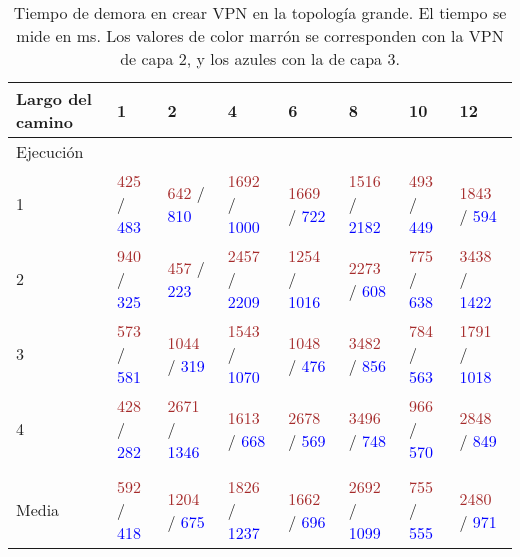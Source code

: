 \begin{table}[ht]
	\scriptsize
	\caption{Tiempo de demora en crear VPN en la topología grande. El tiempo se mide en ms. Los valores de color marrón se corresponden con la VPN de capa 2, y los azules con la de capa 3.}
	\centering 
	\begin{tabular}{p{2.2cm} p{1.4cm} p{1.4cm} p{1.4cm} p{1.4cm} p{1.4cm} p{1.4cm} p{1.4cm}}
		\hline
		Largo del camino & 1 & 2 & 4 & 6 & 8 & 10 & 12 \\ [0.5ex]
		\hline
		Ejecución & & & & & & & \\
		1 & \textcolor{brown}{425} / \textcolor{blue}{483} & \textcolor{brown}{642} / \textcolor{blue}{810} & \textcolor{brown}{1692} / \textcolor{blue}{1000} & \textcolor{brown}{1669} / \textcolor{blue}{722} & \textcolor{brown}{1516} / \textcolor{blue}{2182} & \textcolor{brown}{493} / \textcolor{blue}{449} & \textcolor{brown}{1843} / \textcolor{blue}{594} \\
		2 & \textcolor{brown}{940} / \textcolor{blue}{325} & \textcolor{brown}{457} / \textcolor{blue}{223} & \textcolor{brown}{2457} / \textcolor{blue}{2209} & \textcolor{brown}{1254} / \textcolor{blue}{1016}  & \textcolor{brown}{2273} / \textcolor{blue}{608} & \textcolor{brown}{775} / \textcolor{blue}{638} & \textcolor{brown}{3438} / \textcolor{blue}{1422} \\
		3 & \textcolor{brown}{573} / \textcolor{blue}{581} & \textcolor{brown}{1044} / \textcolor{blue}{319} & \textcolor{brown}{1543} / \textcolor{blue}{1070} & \textcolor{brown}{1048} / \textcolor{blue}{476} & \textcolor{brown}{3482} / \textcolor{blue}{856} & \textcolor{brown}{784} / \textcolor{blue}{563} & \textcolor{brown}{1791} / \textcolor{blue}{1018} \\
		4 & \textcolor{brown}{428} / \textcolor{blue}{282} & \textcolor{brown}{2671} / \textcolor{blue}{1346} & \textcolor{brown}{1613} / \textcolor{blue}{668} & \textcolor{brown}{2678} / \textcolor{blue}{569} & \textcolor{brown}{3496} / \textcolor{blue}{748} & \textcolor{brown}{966} / \textcolor{blue}{570} & \textcolor{brown}{2848} / \textcolor{blue}{849} \\
		& & & & & & & \\
		Media & \textcolor{brown}{592} / \textcolor{blue}{418} & \textcolor{brown}{1204} / \textcolor{blue}{675} & \textcolor{brown}{1826} / \textcolor{blue}{1237} & \textcolor{brown}{1662} / \textcolor{blue}{696} & \textcolor{brown}{2692} / \textcolor{blue}{1099} & \textcolor{brown}{755} / \textcolor{blue}{555} & \textcolor{brown}{2480} / \textcolor{blue}{971} \\

\end{tabular}
\end{table}
